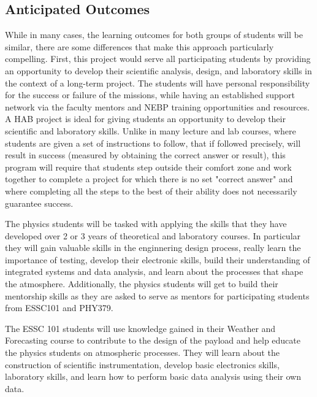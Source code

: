 \documentclass[12pt]{article}
\begin{document}
\subsection{Anticipated Outcomes}
While in many cases, the learning outcomes for both groups of students will be similar, there are
some differences that make this approach particularly compelling. First, this
project would serve all participating students by providing an opportunity to develop
their scientific analysis, design, and laboratory skills in the context of a long-term project. The students will have
personal responsibility for the success or failure of the missions, while having
an established support network via the faculty mentors and NEBP training opportunities and resources.
A HAB project is ideal for giving students an opportunity to develop their scientific and laboratory skills.
Unlike in many lecture and lab courses, where students are given a set of instructions
to follow, that if followed precisely, will result in success (measured by obtaining the correct answer
or result), this program will require that students step outside their comfort zone and work together to
complete a project for which there is no set "correct answer" and where completing all the steps to the
best of their ability does not necessarily guarantee success.

The physics students will be tasked with
applying the skills that they have developed over 2 or 3 years of theoretical and laboratory courses.
In particular they will gain valuable skills in the enginnering design process, really learn the importance
of testing, develop their electronic skills, build their understanding of integrated systems and data analysis,
 and learn
about the processes that shape the atmosphere. Additionally, the physics students will
get to build their mentorship skills as they are asked to serve
as mentors for participating students from ESSC101 and PHY379.

The ESSC 101 students will use knowledge gained
in their Weather and Forecasting course to contribute to the design of the payload and help educate
the physics students on atmospheric processes. They will learn about
the construction of scientific instrumentation, develop basic electronics skills, laboratory skills,
and learn how to perform basic data analysis using their own data.
\end{document}
